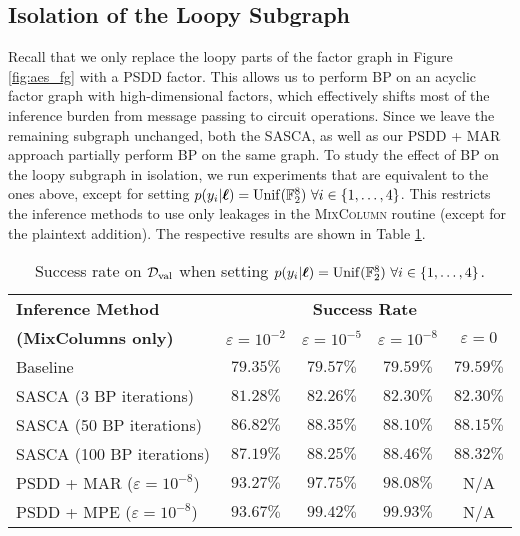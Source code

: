 \subsection{Isolation of the Loopy Subgraph}
\label{sec:exp_isolation}
Recall that we only replace the loopy parts of the factor graph in Figure \ref{fig:aes_fg} with a PSDD factor. This allows us to perform BP on an acyclic factor graph with high-dimensional factors, which effectively shifts most of the inference burden from message passing to circuit operations. Since we leave the remaining subgraph unchanged, both the SASCA, as well as our PSDD + MAR approach partially perform BP on the same graph. To study the effect of BP on the loopy subgraph in isolation, we run experiments that are equivalent to the ones above, except for setting $p(y_i | \boldsymbol{\ell}) = \operatorname{Unif}(\mathbb{F}_2^8) \ \forall i \in \{1,\dots,4\}$. This restricts the inference methods to use only leakages in the \textsc{MixColumn} routine (except for the plaintext addition). The respective results are shown in Table \ref{tab:mixcol_res}.

\begin{table}[H]
    \centering
	\begin{tabular}{|l | c | c | c | c |}
		\hline
    \multicolumn{1}{|l|}{\textbf{Inference Method}} & \multicolumn{4}{c|}{\textbf{Success Rate}} \\
    \cline{2-5}
    \multicolumn{1}{|l|}{\textbf{(MixColumns only)}} & $\varepsilon = 10^{-2}$ & $\varepsilon = 10^{-5}$ & $\varepsilon = 10^{-8}$ & $\varepsilon = 0$\\
	\hline %

		Baseline & $79.35 \%$ & $79.57 \%$ & $79.59 \%$ & $\mathbf{79.59} \%$ \\ \hline %
		SASCA (3 BP iterations)  & $81.28 \%$ & $82.26 \%$ & $82.30 \%$ & $\mathbf{82.30} \%$ \\ \hline %
		SASCA (50 BP iterations)  & $86.82 \%$ & $\mathbf{88.35} \%$ & $88.10 \%$ & $88.15 \%$ \\ \hline %
		SASCA (100 BP iterations)  & $87.19 \%$ & $88.25 \%$ & $\mathbf{88.46} \%$ & $88.32 \%$ \\ \hline %
		PSDD + MAR ($\varepsilon=10^{-8}$)  & $93.27 \%$ & $97.75 \%$ & $\mathbf{98.08} \%$ & N/A \\ \hline %
		PSDD + MPE ($\varepsilon=10^{-8}$)  & $93.67 \%$ & $99.42 \%$ & $\mathbf{99.93} \%$ & N/A \\ \hline %
	\end{tabular}
	\caption{Success rate on $\mathcal{D}_{\text{val}}$ when setting $p(y_i | \boldsymbol{\ell}) = \operatorname{Unif}(\mathbb{F}_2^8) \ \forall i \in \{1,\dots,4\}$.}
    \label{tab:mixcol_res}
\end{table}

